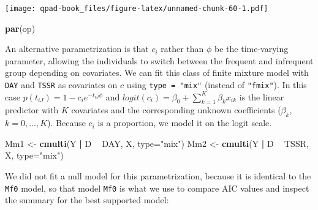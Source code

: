 \documentclass[12pt,]{book}
\newenvironment{Shaded}{\begin{snugshade}}{\end{snugshade}}
\newcommand{\DataTypeTok}[1]{\textcolor[rgb]{0.13,0.29,0.53}{#1}}
\newcommand{\DecValTok}[1]{\textcolor[rgb]{0.00,0.00,0.81}{#1}}
\newcommand{\KeywordTok}[1]{\textcolor[rgb]{0.13,0.29,0.53}{\textbf{#1}}}
\newcommand{\NormalTok}[1]{#1}
\newcommand{\OperatorTok}[1]{\textcolor[rgb]{0.81,0.36,0.00}{\textbf{#1}}}
\newcommand{\StringTok}[1]{\textcolor[rgb]{0.31,0.60,0.02}{#1}}
\begin{document}
\texttt{[image: qpad-book\_files/figure-latex/unnamed-chunk-60-1.pdf]}

\begin{Shaded}
\begin{Highlighting}[]
\KeywordTok{par}\NormalTok{(op)}
\end{Highlighting}
\end{Shaded}

An alternative parametrization is that \(c_{i}\) rather than \(\phi\) be the time-varying parameter,
allowing the individuals to switch between the frequent and infrequent group depending on covariates.
We can fit this class of finite mixture model with \texttt{DAY} and \texttt{TSSR} as covariates on \(c\)
using \texttt{type\ =\ "mix"} (instead of \texttt{"fmix"}).
In this case \(p(t_{iJ}) = 1 - c_{i} e^{-t_{iJ} \phi}\) and
\(logit(c_{i}) = \beta_{0} + \sum^{K}_{k=1} \beta_{k} x_{ik}\) is the linear predictor with \(K\)
covariates and the corresponding unknown coefficients (\(\beta_{k}\), \(k = 0,\ldots, K\)).
Because \(c_{i}\) is a proportion, we model it on the logit scale.

\begin{Shaded}
\begin{Highlighting}[]
\NormalTok{Mm1 <-}\StringTok{ }\KeywordTok{cmulti}\NormalTok{(Y }\OperatorTok{|}\StringTok{ }\NormalTok{D }\OperatorTok{~}\StringTok{ }\NormalTok{DAY, X, }\DataTypeTok{type=}\StringTok{"mix"}\NormalTok{)}
\NormalTok{Mm2 <-}\StringTok{ }\KeywordTok{cmulti}\NormalTok{(Y }\OperatorTok{|}\StringTok{ }\NormalTok{D }\OperatorTok{~}\StringTok{ }\NormalTok{TSSR, X, }\DataTypeTok{type=}\StringTok{"mix"}\NormalTok{)}
\end{Highlighting}
\end{Shaded}

We did not fit a null model for this parametrization, because it is identical to the \texttt{Mf0} model,
so that model \texttt{Mf0} is what we use to compare AIC values and inspect the summary for the best
supported model:

\begin{Shaded}
\end{Shaded}
\end{document}
